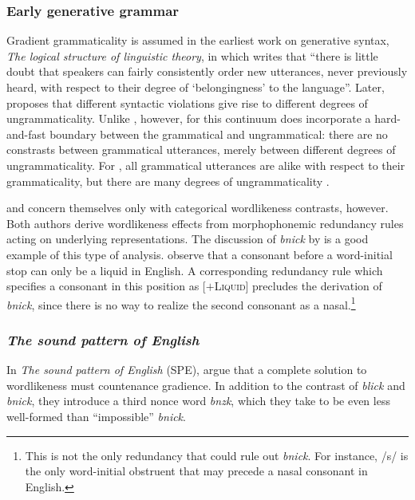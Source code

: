 \subsubsection{Early generative grammar}

Gradient grammaticality is assumed in the earliest work on generative syntax, \emph{The logical structure of linguistic theory}, in which \citet[][132]{LSLT} writes that ``there is little doubt that speakers can fairly consistently order new utterances, never previously heard, with respect to their degree of `belongingness' to the language''. Later, \citet{ASPECTS} proposes that different syntactic violations give rise to different degrees of ungrammaticality. Unlike \citeauthor{Fischer-Jorgensen1952}, however, for \citeauthor{LSLT} this continuum does incorporate a hard-and-fast boundary between the grammatical and ungrammatical: there are no constrasts between grammatical utterances, merely between different degrees of ungrammaticality. For \citeauthor{LSLT}, all grammatical utterances are alike with respect to their grammaticality, but there are many degrees of ungrammaticality \citep[][61]{Schutze1996}.

\citet{Halle1962} and \citet{Stanley1967} concern themselves only with categorical wordlikeness contrasts, however. Both authors derive wordlikeness effects from morphophonemic redundancy rules acting on underlying representations. The discussion of \emph{bnick} by \citet[][101]{Chomsky1965} is a good example of this type of analysis. \citeauthor{Chomsky1965} observe that a consonant before a word-initial stop can only be a liquid in English. A corresponding redundancy rule which specifies a consonant in this position as [$+$\textsc{Liquid}] precludes the derivation of \emph{bnick}, since there is no way to realize the second consonant as a nasal.\footnote{This is not the only redundancy that could rule out \emph{bnick}. For instance, /s/ is the only word-initial obstruent that may precede a nasal consonant in English.}

\subsubsection{\emph{The sound pattern of English}}

In \emph{The sound pattern of English} (SPE), \citet{SPE} argue that a complete solution to wordlikeness must countenance gradience. In addition to the contrast of \emph{blick} and \emph{bnick}, they introduce a third nonce word \emph{bnzk}, which they take to be even less well-formed than ``impossible'' \emph{bnick}. 

